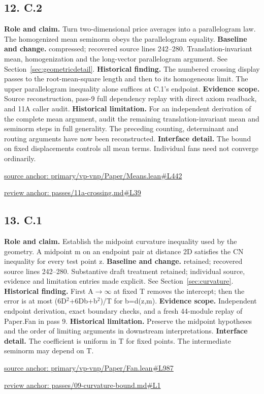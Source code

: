 \documentclass[11pt,letterpaper]{article}
\theoremstyle{definition}\newtheorem{definition}[theorem]{Definition}\newtheorem{example}[theorem]{Example}
\theoremstyle{remark}\newtheorem{remark}[theorem]{Remark}
\begin{document}
\subsection*{12. C.2}
\textbf{Role and claim.} Turn two-dimensional price averages into a parallelogram law. The homogenized mean seminorm obeys the parallelogram equality.
\textbf{Baseline and change.} compressed; recovered source lines 242--280. Translation-invariant mean, homogenization and the long-vector parallelogram argument. See Section~\ref{sec:geometricdetail}.
\textbf{Historical finding.} The numbered crossing display passes to the root-mean-square length and then to its homogeneous limit. The upper parallelogram inequality alone suffices at C.1's endpoint.
\textbf{Evidence scope.} Source reconstruction, pass-9 full dependency replay with direct axiom readback, and 11A caller audit.
\textbf{Historical limitation.} For an independent derivation of the complete mean argument, audit the remaining translation-invariant mean and seminorm steps in full generality. The preceding counting, determinant and routing arguments have now been reconstructed.
\textbf{Interface detail.} The bound on fixed displacements controls all mean terms. Individual fans need not converge ordinarily.
\par\href{https://github.com/nousentllc/VP-VNP-Review/blob/8a7976933b6b2b4ffda1ad3a0dfb5fc6b6f023e8/primary/vp-vnp/Paper/Means.lean\#L442}{source anchor: primary/vp-vnp/Paper/Means.lean\#L442}
\par\href{https://github.com/nousentllc/VP-VNP-Review/blob/8a7976933b6b2b4ffda1ad3a0dfb5fc6b6f023e8/passes/11a-crossing.md\#L39}{review anchor: passes/11a-crossing.md\#L39}
\goodbreak
\subsection*{13. C.1}
\textbf{Role and claim.} Establish the midpoint curvature inequality used by the geometry. A midpoint m on an endpoint pair at distance 2D satisfies the CN inequality for every test point z.
\textbf{Baseline and change.} retained; recovered source lines 242--280. Substantive draft treatment retained; individual source, evidence and limitation entries made explicit. See Section~\ref{sec:curvature}.
\textbf{Historical finding.} First A\ensuremath{\to}\ensuremath{\infty} at fixed T removes the intercept; then the error is at most (6D\ensuremath{{}^2}+6Db+b\ensuremath{{}^2})/T for b=d(z,m).
\textbf{Evidence scope.} Independent endpoint derivation, exact boundary checks, and a fresh 44-module replay of Paper.Fan in pass 9.
\textbf{Historical limitation.} Preserve the midpoint hypotheses and the order of limiting arguments in downstream interpretations.
\textbf{Interface detail.} The coefficient is uniform in T for fixed points. The intermediate seminorm may depend on T.
\par\href{https://github.com/nousentllc/VP-VNP-Review/blob/8a7976933b6b2b4ffda1ad3a0dfb5fc6b6f023e8/primary/vp-vnp/Paper/Fan.lean\#L987}{source anchor: primary/vp-vnp/Paper/Fan.lean\#L987}
\par\href{https://github.com/nousentllc/VP-VNP-Review/blob/8a7976933b6b2b4ffda1ad3a0dfb5fc6b6f023e8/passes/09-curvature-bound.md\#L1}{review anchor: passes/09-curvature-bound.md\#L1}
\goodbreak
\end{document}
